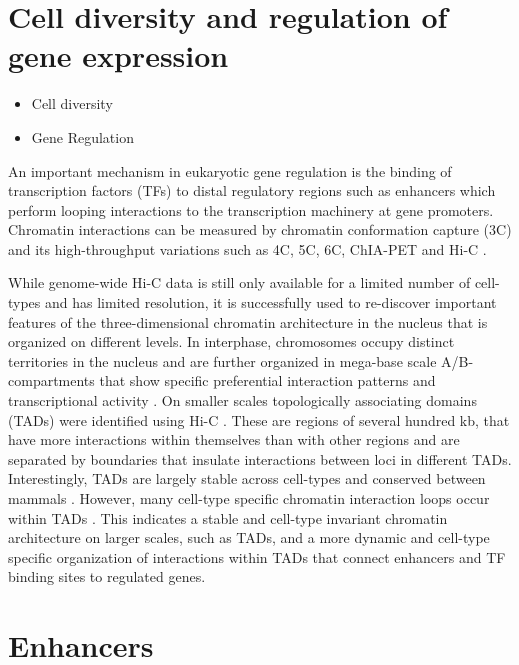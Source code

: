 \documentclass[a4paper,twoside=true,openright,parskip=full,chapterprefix=true,11pt,headings=normal,bibliography=totoc,listof=totoc,titlepage=on,captions=tableabove,draft=false]{scrreprt}
\providecommand{\tightlist}{%
  \setlength{\itemsep}{0pt}\setlength{\parskip}{0pt}}
\theoremstyle{definition}
\theoremstyle{definition}
\theoremstyle{definition}
\theoremstyle{remark}
\begin{document}
\section{Cell diversity and regulation of gene
expression}\label{cell-diversity-and-regulation-of-gene-expression}

\begin{itemize}
\tightlist
\item
  Cell diversity
\item
  Gene Regulation
\end{itemize}

An important mechanism in eukaryotic gene regulation is the binding of
transcription factors (TFs) to distal regulatory regions such as
enhancers which perform looping interactions to the transcription
machinery at gene promoters. Chromatin interactions can be measured by
chromatin conformation capture (3C) and its high-throughput variations
such as 4C, 5C, 6C, ChIA-PET and Hi-C
\citep{Dekker2013, Lieberman-Aiden2009}.

While genome-wide Hi-C data is still only available for a limited number
of cell-types and has limited resolution, it is successfully used to
re-discover important features of the three-dimensional chromatin
architecture in the nucleus that is organized on different levels. In
interphase, chromosomes occupy distinct territories in the nucleus
\citep{Cremer2001} and are further organized in mega-base scale
A/B-compartments that show specific preferential interaction patterns
and transcriptional activity \citep{Lieberman-Aiden2009, Rao2014}. On
smaller scales topologically associating domains (TADs) were identified
using Hi-C \citep{Dixon2012, Nora2012, Sexton2012}. These are regions of
several hundred kb, that have more interactions within themselves than
with other regions and are separated by boundaries that insulate
interactions between loci in different TADs. Interestingly, TADs are
largely stable across cell-types and conserved between mammals
\citep{Dixon2012, Rao2014, Dixon2015, VietriRudan2015}. However, many
cell-type specific chromatin interaction loops occur within TADs
\citep{Rao2014, Dixon2015}. This indicates a stable and cell-type
invariant chromatin architecture on larger scales, such as TADs, and a
more dynamic and cell-type specific organization of interactions within
TADs that connect enhancers and TF binding sites to regulated genes.

\section{Enhancers}\label{enhancers}
\end{document}
